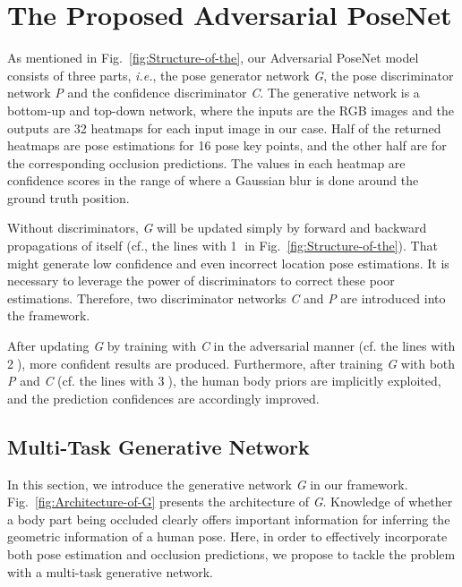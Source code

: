 \documentclass[10pt,letterpaper,twocolumn]{article}
\begin{document}
\section{The Proposed Adversarial PoseNet}\label{sec:GcNet-for-Human}

As mentioned in Fig.~\ref{fig:Structure-of-the}, our Adversarial PoseNet model consists of three parts, \emph{i.e.}, the pose generator network \textit{G}, the pose discriminator network \textit{P} and the confidence discriminator \textit{C}. The generative network is a bottom-up and top-down network, where the inputs are the RGB images and the outputs are 32 heatmaps for each input image in our case. Half of the returned heatmaps are pose estimations for 16 pose key points, and the other half are for the corresponding occlusion predictions. The values in each heatmap are confidence scores in the range of  where a Gaussian blur is done around the ground truth position.

Without discriminators, \textit{G} will be updated simply by forward and backward propagations of itself ({cf.}, the lines with \textcircled{1} in Fig.~\ref{fig:Structure-of-the}). That might generate low confidence and even incorrect location pose estimations. It is necessary to leverage the power of discriminators to correct these poor estimations. Therefore, two discriminator networks \emph{C} and \emph{P} are introduced into the framework.

After updating \textit{G} by training with \textit{C} in the adversarial manner (cf. the lines with \textcircled{2}), more confident results are produced. Furthermore, after training \textit{G} with both \textit{P} and \textit{C} (cf. the lines with \textcircled{3}), the human body priors are  implicitly exploited,  and the prediction confidences are accordingly improved.

\subsection{Multi-Task Generative Network}\label{subsec:Multi-task-Generative-Network}

In this section, we introduce the generative network \emph{G} in our framework. Fig.~\ref{fig:Architecture-of-G} presents the architecture of \emph{G}.
Knowledge of whether a body part being occluded clearly offers important information for inferring the geometric information of a human pose. Here, in order to effectively incorporate both pose estimation and occlusion predictions, we propose to tackle the problem with a multi-task generative network.
\end{document}
